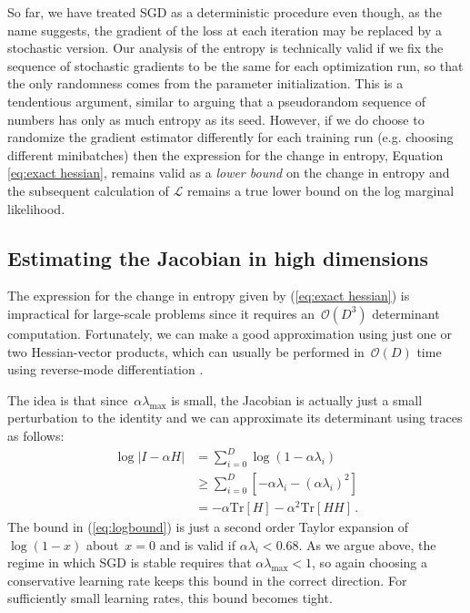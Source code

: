 \documentclass[]{article}
\newcommand{\varL}{\mathcal{L}}
\newcommand{\stepsize}{\alpha}
\newcommand{\bigo}[1]{\mathcal{O}\left(#1\right)}
\newcommand{\trace}[1]{\text{Tr}\left[#1\right]}
\begin{document}
So far, we have treated SGD as a deterministic procedure even though, as the name suggests,
the gradient of the loss at each iteration may be replaced by a stochastic
version. Our analysis of the entropy is technically valid if we fix the sequence of stochastic gradients to be the same for each optimization run, so that the only randomness comes from the parameter initialization.
This is a tendentious argument, similar to arguing that a pseudorandom sequence of numbers has only as much entropy as its seed.
However, if we do choose to randomize the gradient estimator differently for each training run
(e.g. choosing different minibatches) then the expression for the change in entropy, Equation \ref{eq:exact hessian}, remains valid as a \emph{lower bound} on the change in entropy and the 
subsequent calculation of $\varL$ remains a true lower bound on the log marginal likelihood.


\subsection{Estimating the Jacobian in high dimensions}
\label{sec:scalable-estimator}
The expression for the change in entropy given by (\ref{eq:exact hessian}) is impractical for large-scale problems since it requires an~$\bigo{D^3}$ determinant computation.
Fortunately, we can make a good approximation using just one or two Hessian-vector products, which can usually be performed in~$\bigo{D}$ time using reverse-mode differentiation \citep{pearlmutter1994fast}.

The idea is that since~$\stepsize\lambda_{\text{max}}$ is small, the Jacobian is actually just a small perturbation to the identity and we can approximate its determinant using traces as follows:
%
\begin{align}
\log \left| I - \stepsize H \right|
& =    \sum_{i=0}^D \log\left(1 - \stepsize\lambda_i\right) \nonumber\\
& \geq \sum_{i=0}^D \left[- \stepsize\lambda_i 
                        - (\stepsize\lambda_i)^2 \right] \label{eq:logbound} \\
& = - \stepsize \trace{H} - \stepsize^2 \trace{HH}\,.
\end{align}
%
The bound in (\ref{eq:logbound}) is just a second order Taylor expansion of~$\log(1 - x)$ about~${x = 0}$ and is valid if ${\stepsize\lambda_i < 0.68}$.
As we argue above, the regime in which SGD is stable requires that $\stepsize\lambda_{\text{max}} < 1$, so again choosing a conservative learning rate keeps this bound in the correct direction.
For sufficiently small learning rates, this bound becomes tight.
\end{document}
